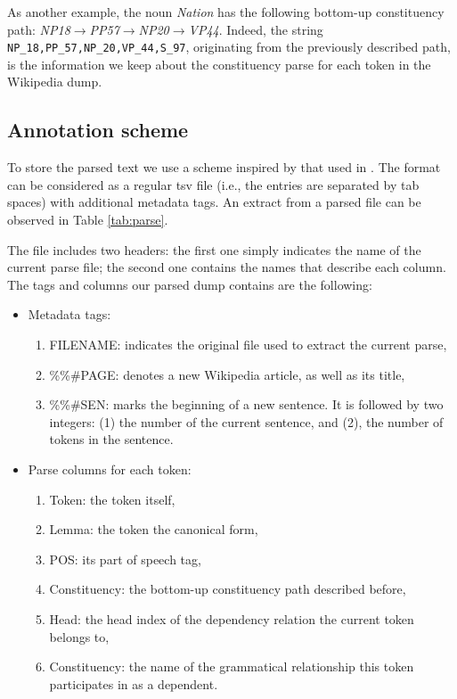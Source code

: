 


As another example, the noun \textit{Nation} has the following bottom-up constituency path: \textit{NP18}$\rightarrow$\textit{PP57}$\rightarrow$\textit{NP20}$\rightarrow $\textit{VP44}. Indeed, the string \texttt{NP\_18,PP\_57,NP\_20,VP\_44,S\_97}, originating from the previously described path,  is the information we keep about the constituency parse for each token in the Wikipedia dump.



\subsection{Annotation scheme}\label{section3.2}
To store the parsed text we use a scheme  inspired by that used in \cite{ATSERIAS08}. The format can be considered as a regular tsv file (i.e., the entries are separated by tab spaces) with additional metadata tags. An extract from a parsed file can be observed in Table \ref{tab:parse}. 

The file includes two headers: the first one simply indicates the name of the current parse file; the second one contains the names that describe each column. The tags and columns our parsed dump contains are the following:
\begin{itemize}
\item Metadata tags:
\begin{enumerate}
\item {FILENAME}: indicates the original file used to extract the current parse, 
\item {\%\%\#PAGE}: denotes a new Wikipedia article, as well as its title, 
\item {\%\%\#SEN}: marks the beginning of a new sentence. It is followed by two integers: (1) the number of the current sentence, and (2), the number of tokens in the sentence.

\end{enumerate}

\item Parse columns for each token:
\begin{enumerate}
\item Token: the token itself,
\item Lemma: the token the canonical form,
\item POS: its part of speech tag,
\item Constituency: the bottom-up constituency path described before,
\item Head: the head index of the dependency relation the current token belongs to,
\item Constituency: the name of the grammatical relationship this token participates in as a dependent.
\end{enumerate}
\end{itemize}

